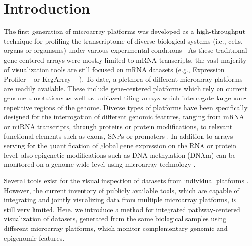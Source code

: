 \documentclass{bioinfo}
\begin{document}
\section{Introduction}

The first generation of microarray platforms was developed as a high-throughput technique for
profiling the transcriptome of diverse biological systems (i.e., cells, organs or organisms) under
various experimental conditions \citep{Golub1999, Schena1995}. As these traditional gene-centered arrays
were mostly limited to mRNA transcripts, the vast majority of visualization tools are still focused
on mRNA datasets (e.g., Expression Profiler -- \citealp{Kapushesky2004} or KegArray -- \citealp{KEGG}). To date, a plethora of different microarray platforms are readily available. These include gene-centered platforms which rely on current genome annotations as well as
unbiased tiling arrays which interrogate large non-repetitive regions of the genome. Diverse types
of platforms have been specifically designed for the interrogation of different genomic features,
ranging from mRNA or miRNA transcripts, through proteins or protein modifications, to relevant
functional elements such as exons, SNPs or promoters \citep{Hoheisel2006}. In addition to arrays serving for
the quantification of global gene expression on the RNA or protein level, also epigenetic
modifications such as DNA methylation (DNAm) can be monitored on a genome-wide level using
microarray technology \citep{Schumacher2006}.

Several tools exist for the visual inspection of datasets from individual platforms
\citep[see][for some examples]{Gehlenborg2010}. However, the current inventory of publicly available tools, which are capable of
integrating and jointly visualizing data from multiple microarray platforms, is still very limited.
Here, we introduce a method for integrated pathway-centered visualization of datasets, generated
from the same biological samples using different microarray platforms, which monitor
complementary genomic and epigenomic features.
\end{document}
